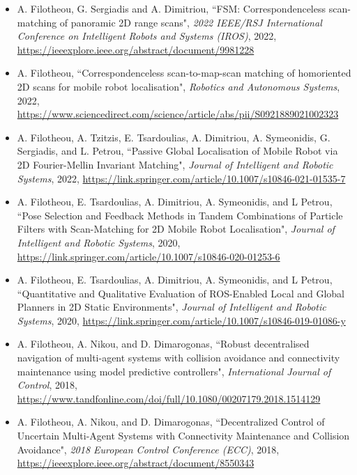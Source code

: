 \begin{itemize}
  \item A. Filotheou, G. Sergiadis and A. Dimitriou, ``FSM: Correspondenceless scan-matching of panoramic 2D range scans", \textit{2022 IEEE/RSJ International Conference on Intelligent Robots and Systems (IROS)}, 2022, \url{https://ieeexplore.ieee.org/abstract/document/9981228}
  \item A. Filotheou, ``Correspondenceless scan-to-map-scan matching of homoriented 2D scans for mobile robot localisation", \textit{Robotics and Autonomous Systems}, 2022, \url{https://www.sciencedirect.com/science/article/abs/pii/S0921889021002323}
  \item A. Filotheou, A. Tzitzis, E. Tsardoulias, A. Dimitriou, A. Symeonidis, G. Sergiadis, and L. Petrou, ``Passive Global Localisation of Mobile Robot via 2D Fourier-Mellin Invariant Matching", \textit{Journal of  Intelligent and Robotic Systems}, 2022, \url{https://link.springer.com/article/10.1007/s10846-021-01535-7}
  \item A. Filotheou, E. Tsardoulias, A. Dimitriou, A. Symeonidis, and L Petrou, ``Pose Selection and Feedback Methods in Tandem Combinations of Particle Filters with Scan-Matching for 2D Mobile Robot Localisation", \textit{Journal of  Intelligent and Robotic Systems}, 2020, \url{https://link.springer.com/article/10.1007/s10846-020-01253-6}
  \item A. Filotheou, E. Tsardoulias, A. Dimitriou, A. Symeonidis, and L Petrou, ``Quantitative and Qualitative Evaluation of ROS-Enabled Local and Global Planners in 2D Static Environments", \textit{Journal of  Intelligent and Robotic Systems}, 2020, \url{https://link.springer.com/article/10.1007/s10846-019-01086-y}
  \item A. Filotheou, A. Nikou, and D. Dimarogonas, ``Robust decentralised navigation of multi-agent systems with collision avoidance and connectivity maintenance using model predictive controllers", \textit{International Journal of Control}, 2018, \url{https://www.tandfonline.com/doi/full/10.1080/00207179.2018.1514129}
  \item A. Filotheou, A. Nikou, and D. Dimarogonas, ``Decentralized Control of Uncertain Multi-Agent Systems with Connectivity Maintenance and Collision Avoidance", \textit{2018 European Control Conference (ECC)}, 2018, \url{https://ieeexplore.ieee.org/abstract/document/8550343}
\end{itemize}
